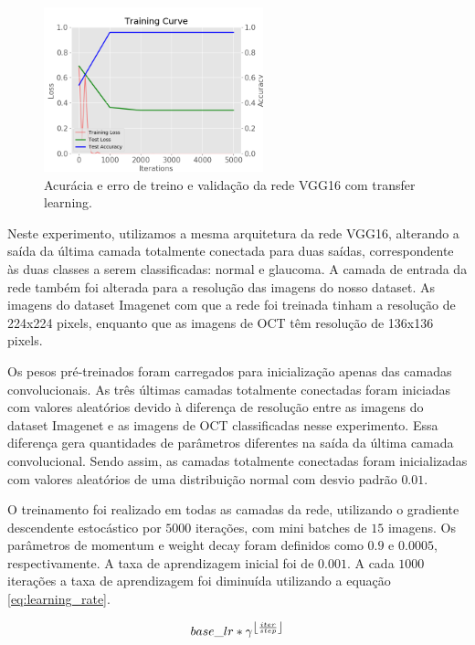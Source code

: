 \documentclass[conference]{IEEEtran}
\DeclarePairedDelimiter\floor{\lfloor}{\rfloor}
\begin{document}

  \begin{figure}[!tp]
    \centering
    \includegraphics[width=2.5in]{img/curve_vgg16.png}
    \caption{Acurácia e erro de treino e validação da rede VGG16 com transfer learning.}
    \label{fig:acuracia_vgg16_transfer}
  \end{figure}


  Neste experimento, utilizamos a mesma arquitetura da rede VGG16, alterando a saída da última camada totalmente conectada para duas saídas, correspondente às duas classes a serem classificadas: normal e glaucoma. A camada de entrada da rede também foi alterada para a resolução das imagens do nosso dataset. As imagens do dataset Imagenet com que a rede foi treinada tinham a resolução de 224x224 pixels, enquanto que as imagens de OCT têm resolução de 136x136 pixels.
  
  Os pesos pré-treinados foram carregados para inicialização apenas das camadas convolucionais. As três últimas camadas totalmente conectadas foram iniciadas com valores aleatórios devido à diferença de resolução entre as imagens do dataset Imagenet e as imagens de OCT classificadas nesse experimento. Essa diferença gera quantidades de parâmetros diferentes na saída da última camada convolucional. Sendo assim, as camadas totalmente conectadas foram inicializadas com valores aleatórios de uma distribuição normal com desvio padrão $0.01$.

  O treinamento foi realizado em todas as camadas da rede, utilizando o gradiente descendente estocástico por $5000$ iterações, com mini batches de $15$ imagens. Os parâmetros de momentum e weight decay foram definidos como $0.9$ e $0.0005$, respectivamente. A taxa de aprendizagem inicial foi de $0.001$. A cada $1000$ iterações a taxa de aprendizagem foi diminuída utilizando a equação \ref{eq:learning_rate}.

  \begin{equation}
    base\_lr * \gamma^{\floor*{\frac{iter}{step}}}
    \label{eq:learning_rate}
  \end{equation}
\end{document}
